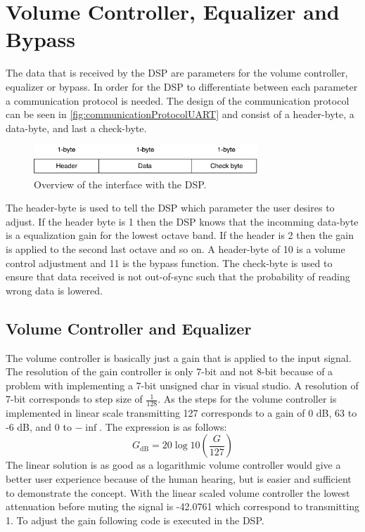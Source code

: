 \section{Volume Controller, Equalizer and Bypass}\label{sec:Bypass}

The data that is received by the DSP are parameters for the volume controller, equalizer or bypass. In order for the DSP to differentiate between each parameter a communication protocol is needed. The design of the communication protocol can be seen in \autoref{fig:communicationProtocolUART} and consist of a header-byte, a data-byte, and last a check-byte. 
\begin{figure}[H]
\centering
\includegraphics[width=0.75\textwidth]{figures/communicationProtocolUART.pdf}
\caption{Overview of the interface with the DSP.}
\label{fig:communicationProtocolUART}
\end{figure}
The header-byte is used to tell the DSP which parameter the user desires to adjust. If the header byte is 1 then the DSP knows that the incomming data-byte is a equalization gain for the lowest octave band. If the header is 2 then the gain is applied to the second last octave and so on. A header-byte of 10 is a volume control adjustment and 11 is the bypass function. The check-byte is used to ensure that data received is not out-of-sync such that the probability of reading wrong data is lowered.

\subsection*{Volume Controller and Equalizer}
The volume controller is basically just a gain that is applied to the input signal. The resolution of the gain controller is only 7-bit and not 8-bit because of a problem with implementing a 7-bit unsigned char in visual studio. A resolution of 7-bit corresponds to step size of $\frac{1}{128}$. As the steps for the volume controller is implemented in linear scale transmitting 127 corresponds to a gain of 0 dB, 63 to -6 dB, and 0 to $-\inf$. The expression is as follows:
\begin{equation}
G_{\text{dB}} = 20 \log 10 \left( \frac{G}{127} \right)
\end{equation}
The linear solution is as good as a logarithmic volume controller would give a better user experience because of the human hearing, but is easier and sufficient to demonstrate the concept. With the linear scaled volume controller the lowest attenuation before muting the signal is -42.0761 which correspond to transmitting 1. To adjust the gain following code is executed in the DSP.

